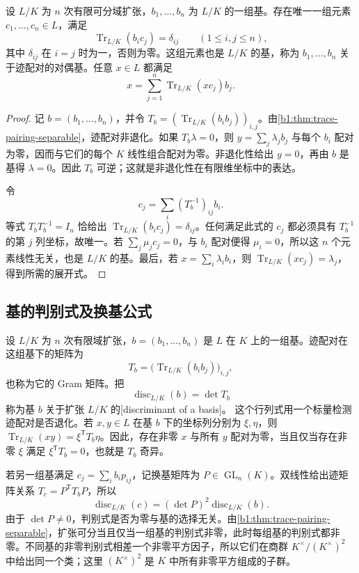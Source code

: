 \begin{corollary}\label{b1:cor:trace-dual-basis}
	设 \(L/K\) 为 \(n\) 次有限可分域扩张，\(b_1,\ldots,b_n\) 为 \(L/K\) 的一组基。存在唯一一组元素 \(c_1,\ldots,c_n\in L\)，满足
	\[
		\operatorname{Tr}_{L/K}(b_i c_j)=\delta_{ij}\qquad(1\le i,j\le n),
	\]
	其中 \(\delta_{ij}\) 在 \(i=j\) 时为一，否则为零。这组元素也是 \(L/K\) 的基，称为 \(b_1,\ldots,b_n\) 关于迹配对的对偶基。任意 \(x\in L\) 都满足
	\[
		x=\sum_{j=1}^n\operatorname{Tr}_{L/K}(xc_j)b_j.
	\]
\end{corollary}
\begin{proof}
	记 \(b=(b_1,\ldots,b_n)\)，并令 \(T_b=(\operatorname{Tr}_{L/K}(b_i b_j))_{i,j}\)。由\cref{b1:thm:trace-pairing-separable}，迹配对非退化。如果 \(T_b\lambda=0\)，则 \(y=\sum_j\lambda_jb_j\) 与每个 \(b_i\) 配对为零，因而与它们的每个 \(K\) 线性组合配对为零。非退化性给出 \(y=0\)，再由 \(b\) 是基得 \(\lambda=0\)。因此 \(T_b\) 可逆；这就是非退化性在有限维坐标中的表达。

	令
	\[
		c_j=\sum_i(T_b^{-1})_{ij}b_i.
	\]
	等式 \(T_bT_b^{-1}=I_n\) 恰给出 \(\operatorname{Tr}_{L/K}(b_i c_j)=\delta_{ij}\)。任何满足此式的 \(c_j\) 都必须具有 \(T_b^{-1}\) 的第 \(j\) 列坐标，故唯一。若 \(\sum_j\mu_jc_j=0\)，与 \(b_i\) 配对便得 \(\mu_i=0\)，所以这 \(n\) 个元素线性无关，也是 \(L/K\) 的基。最后，若 \(x=\sum_i\lambda_i b_i\)，则 \(\operatorname{Tr}_{L/K}(xc_j)=\lambda_j\)，得到所需的展开式。
\end{proof}

\subsection{基的判别式及换基公式}
\label{b1:subsec:1803:03}

设 \(L/K\) 为 \(n\) 次有限域扩张，\(b=(b_1,\ldots,b_n)\) 是 \(L\) 在 \(K\) 上的一组基。迹配对在这组基下的矩阵为
\[
	T_b=\bigl(\operatorname{Tr}_{L/K}(b_i b_j)\bigr)_{i,j},
\]
也称为它的 Gram 矩阵。把
\[
	\operatorname{disc}_{L/K}(b)=\det T_b
\]
称为基 \(b\) 关于扩张 \(L/K\) 的[discriminant of a basis]。
这个行列式用一个标量检测迹配对是否退化。若 \(x,y\in L\) 在基 \(b\) 下的坐标列分别为 \(\xi,\eta\)，则 \(\operatorname{Tr}_{L/K}(xy)=\xi^{\mathsf T}T_b\eta\)。因此，存在非零 \(x\) 与所有 \(y\) 配对为零，当且仅当存在非零 \(\xi\) 满足 \(\xi^{\mathsf T}T_b=0\)，也就是 \(T_b\) 奇异。

\ProseParagraphBreak
若另一组基满足 \(c_j=\sum_i b_i p_{ij}\)，记换基矩阵为 \(P\in\operatorname{GL}_n(K)\)。双线性给出迹矩阵关系 \(T_c=P^{\mathsf T}T_bP\)，所以
\begin{equation}\label{b1:eq:discriminant-change-basis}
	\operatorname{disc}_{L/K}(c)=(\det P)^2\operatorname{disc}_{L/K}(b).
\end{equation}
由于 \(\det P\ne0\)，判别式是否为零与基的选择无关。由\cref{b1:thm:trace-pairing-separable}，扩张可分当且仅当一组基的判别式非零，此时每组基的判别式都非零。不同基的非零判别式相差一个非零平方因子，所以它们在商群 \(K^\times/(K^\times)^2\) 中给出同一个类；这里 \((K^\times)^2\) 是 \(K\) 中所有非零平方组成的子群。

